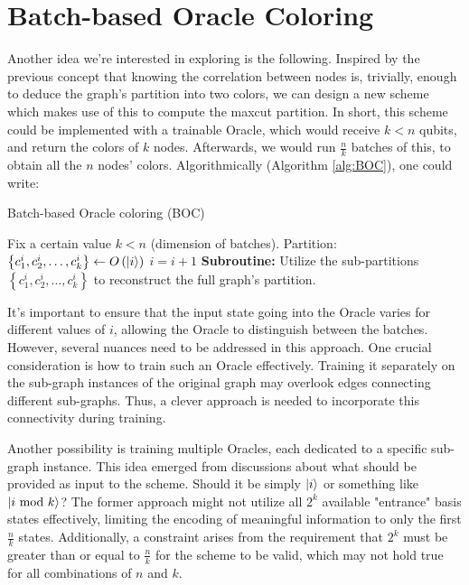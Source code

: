 \section{Batch-based Oracle Coloring}
\label{section:Oracle_Coloring}
Another idea we're interested in exploring is the following. Inspired by the previous concept that knowing the correlation between nodes is, trivially, enough to deduce the graph's partition into two colors, we can design a new scheme which makes use of this to compute the \acrshort{maxcut} partition. In short, this scheme could be implemented with a trainable Oracle, which would receive $k < n$ qubits, and return the colors of $k$ nodes. Afterwards, we would run $\frac{n}{k}$ batches of this, to obtain all the $n$ nodes' colors. Algorithmically (Algorithm \ref{alg:BOC}), one could write:

\begin{algorithm}
\caption{Batch-based Oracle coloring (BOC)}\label{alg:BOC}
\begin{algorithmic}
\State Fix a certain value $k < n$ (dimension of batches).
    \State Partition: $\left\{c^i_1, c^i_2, \ldots, c^i_k\right\} \gets O\left(\ket{i}\right)$
    \State $i = i + 1$
\EndFor
\State \textbf{Subroutine:} Utilize the sub-partitions $\left\{c^i_1, c^i_2, \ldots, c^i_k\right\}$ to reconstruct the full graph's partition.
\end{algorithmic}
\end{algorithm}

It's important to ensure that the input state going into the Oracle varies for different values of $i$, allowing the Oracle to distinguish between the batches. However, several nuances need to be addressed in this approach. One crucial consideration is how to train such an Oracle effectively. Training it separately on the sub-graph instances of the original graph may overlook edges connecting different sub-graphs. Thus, a clever approach is needed to incorporate this connectivity during training. 

Another possibility is training multiple Oracles, each dedicated to a specific sub-graph instance. This idea emerged from discussions about what should be provided as input to the scheme. Should it be simply $\ket{i}$ or something like $\ket{i \text{ mod } k}$? The former approach might not utilize all $2^k$ available "entrance" basis states effectively, limiting the encoding of meaningful information to only the first $\frac{n}{k}$ states. Additionally, a constraint arises from the requirement that $2^k$ must be greater than or equal to $\frac{n}{k}$ for the scheme to be valid, which may not hold true for all combinations of $n$ and $k$. 

